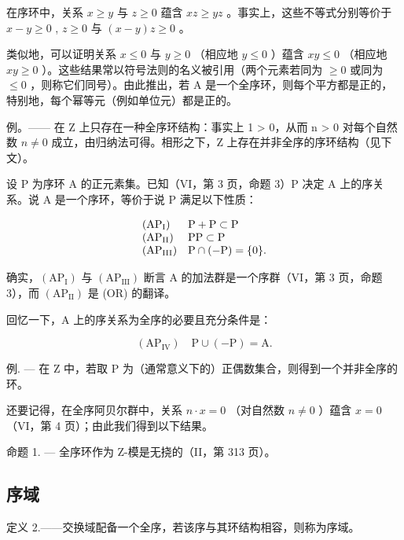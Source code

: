 在序环中，关系 \(x \geqslant y\) 与 \(z \geqslant 0\) 蕴含 \(xz \geqslant yz\) 。事实上，这些不等式分别等价于 \(x - y \geqslant 0\) , \(z \geqslant 0\) 与 \((x - y)z \geqslant 0\) 。

类似地，可以证明关系 \(x \leqslant 0\) 与 \(y \geqslant 0\) （相应地 \(y \leqslant 0\) ）蕴含 \(xy \leqslant 0\) （相应地 \(xy \geqslant 0\) ）。这些结果常以符号法则的名义被引用（两个元素若同为 \(\geqslant 0\) 或同为 \(\leqslant 0\) ，则称它们同号）。由此推出，若 A 是一个全序环，则每个平方都是正的，特别地，每个幂等元（例如单位元）都是正的。

例。—— 在 Z 上只存在一种全序环结构：事实上 1 \textgreater{} 0，从而 n \textgreater{} 0 对每个自然数 \(n \neq 0\) 成立，由归纳法可得。相形之下，Z 上存在并非全序的序环结构（见下文）。

设 P 为序环 A 的正元素集。已知（VI，第 3 页，命题 3）P 决定 A 上的序关系。说 A 是一个序环，等价于说 P 满足以下性质：

\[
\begin{array}{l l} \left(\mathrm{AP} _ {\mathrm{I}}\right) & \mathrm{P} + \mathrm{P} \subset \mathrm{P} \\ \left(\mathrm{AP} _ {\mathrm{II}}\right) & \mathrm{PP} \subset \mathrm{P} \\ \left(\mathrm{AP} _ {\mathrm{III}}\right) & \mathrm{P} \cap (- \mathrm{P}) = \{0 \}. \end{array}
\]

确实，\((\mathrm{AP}_{\mathrm{I}})\) 与 \((\mathrm{AP}_{\mathrm{III}})\) 断言 A 的加法群是一个序群（VI，第 3 页，命题 3），而 \((\mathrm{AP}_{\mathrm{II}})\) 是 (OR) 的翻译。

回忆一下，A 上的序关系为全序的必要且充分条件是：

\[
\left(\mathrm{AP} _ {\mathrm{IV}}\right) \quad \mathrm{P} \cup (- \mathrm{P}) = \mathrm{A}.
\]

例. --- 在 Z 中，若取 P 为（通常意义下的）正偶数集合，则得到一个并非全序的环。

还要记得，在全序阿贝尔群中，关系 \(n \cdot x = 0\) （对自然数 \(n \neq 0\) ）蕴含 \(x = 0\) （VI，第 4 页）；由此我们得到以下结果。

命题 1. --- 全序环作为 Z-模是无挠的（II，第 313 页）。

\subsection{序域}

定义 2.——交换域配备一个全序，若该序与其环结构相容，则称为序域。

